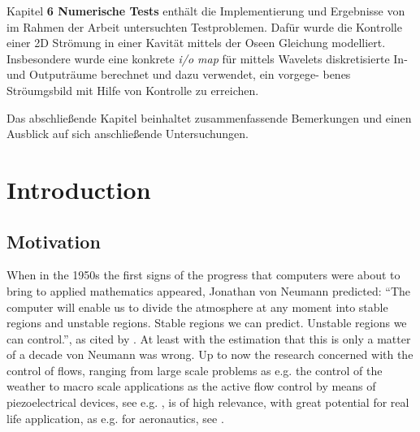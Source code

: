 \documentclass[a4paper,10pt,BCOR=15mm]{scrbook}
\begin{document}
Kapitel \textbf{6 Numerische Tests} enthält die Implementierung und Ergebnisse von im Rahmen der Arbeit untersuchten Testproblemen. Dafür wurde die Kontrolle einer 2D Strömung in einer Kavität mittels der Oseen Gleichung modelliert. Insbesondere wurde eine konkrete \textit{i/o map} für mittels Wavelets diskretisierte In- und Outputräume berechnet und dazu verwendet, ein vorgege- benes Ströumgsbild mit Hilfe von Kontrolle zu erreichen.

Das abschließende Kapitel beinhaltet zusammenfassende Bemerkungen und einen Ausblick auf sich anschließende Untersuchungen. 




\tableofcontents

\chapter{ Introduction}
\section{Motivation}
When in the 1950s the first signs of the progress that computers were about to bring to applied mathematics appeared, Jonathan von Neumann predicted: ``The computer will enable us to divide the atmosphere at any moment into stable regions and unstable regions. Stable regions we can predict. Unstable regions we can control.'', as cited by \cite[p. 219]{dyso}. At least with the estimation that this is only a matter of a decade von Neumann was wrong. Up to now the research concerned with the control of flows, ranging from large scale problems as e.g. the control of the weather to macro scale applications as the active flow control by means of piezoelectrical devices, see e.g. \cite{piezo}, is of high relevance, with great potential for real life application, as e.g. for aeronautics, see \cite{gadel,gunzo}.
\end{document}
